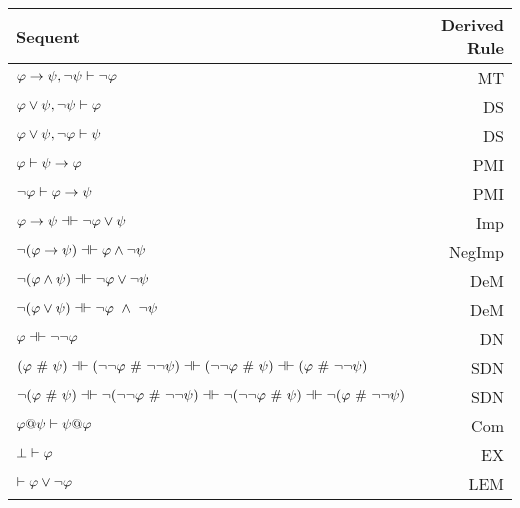 \begin{center}
\begin{tabular}{l  r}
\textbf{Sequent}                    &       \textbf{Derived Rule} \\ \hline
$\mathcal{\varphi} \rightarrow \mathcal{\psi},  \neg\mathcal{\psi} \vdash \neg \mathcal{\varphi}$   &                       MT  \\
$\mathcal{\varphi} \vee \mathcal{\psi},  \neg\mathcal{\psi} \vdash \mathcal{\varphi}$ & DS\\
$\mathcal{\varphi} \vee \mathcal{\psi},  \neg\mathcal{\varphi}\vdash \mathcal{\psi}$    &      DS  \\
$\mathcal{\varphi} \vdash\mathcal{\psi} \rightarrow \mathcal{\varphi}$  &              PMI  \\
$\neg\mathcal{\varphi}\vdash\mathcal{\varphi}\rightarrow \mathcal{\psi}$  & PMI\\
$\meta{\varphi} \rightarrow\meta{\psi} \pequiv \enot\meta{\varphi}\eor \meta{\psi}$  &                   Imp   \\
$\enot (\meta{\varphi} \rightarrow \meta{\psi}) \pequiv \meta{\varphi} \eand \enot \meta{\psi}$  &               NegImp  \\
$\enot (\meta{\varphi} \eand \meta{\psi})  \pequiv \enot\meta{\varphi}\eor \enot \meta{\psi}$  &                DeM  \\
$\enot (\meta{\varphi} \eor \meta{\psi}) \pequiv \enot\meta{\varphi}\ \eand \ \enot \meta{\psi}$   &               DeM  \\
$\meta{\varphi} \pequiv \enot \enot \meta{\varphi}$     &                              DN  \\
$(\meta{\varphi}  \ \#\  \meta{\psi}) \pequiv (\enot \enot \meta{\varphi}  \ \#\   \enot \enot \meta{\psi}) \pequiv (\enot \enot \meta{\varphi}  \ \#\  \meta{\psi}) \pequiv (\meta{\varphi}  \ \#\  \enot \enot  \meta{\psi})$ & SDN\\
$\enot (\meta{\varphi}  \ \#\  \meta{\psi}) \pequiv \enot (\enot \enot \meta{\varphi}  \ \#\   \enot \enot \meta{\psi}) \pequiv \enot (\enot \enot \meta{\varphi}  \ \#\  \meta{\psi}) \pequiv \enot (\meta{\varphi}  \ \#\  \enot \enot  \meta{\psi})$ & SDN\\
$\mathcal{\varphi} @ \mathcal{\psi}  \vdash  \mathcal{\psi} @ \mathcal{\varphi}$ &                          Com \\
$\bot \vdash \mathcal{\varphi}$ & EX \\
 $\vdash \mathcal{\varphi}\vee \neg \mathcal{\varphi}$ &                                                    LEM \\
\end{tabular}
\end{center}

